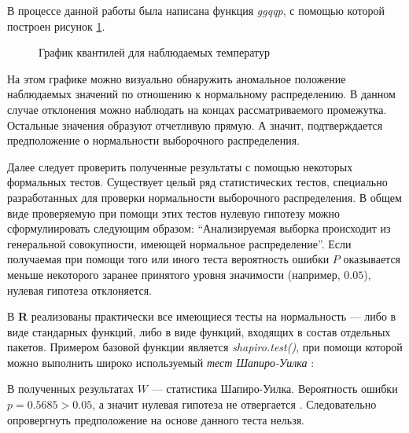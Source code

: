 В процессе данной работы была написана функция \textit{ggqqp}, с помощью которой построен рисунок \ref{img:qqnorm}.
\begin{figure}[ht]
\caption{График квантилей для наблюдаемых температур}
\label{img:qqnorm}
\end{figure}
На этом графике можно визуально обнаружить аномальное положение наблюдаемых значений по отношению к нормальному распределению. В данном случае отклонения можно наблюдать на концах рассматриваемого промежутка. Остальные значения образуют отчетливую прямую. А значит, подтверждается предположение о нормальности выборочного распределения.

Далее следует проверить полученные результаты с помощью некоторых формальных тестов. Существует целый ряд статистических тестов, специально разработанных для проверки нормальности выборочного распределения. В общем виде проверяемую при помощи этих тестов нулевую гипотезу можно сформулиировать следующим образом: ``Анализируемая выборка происходит из генеральной совокупности, имеющей нормальное распределение''. Если получаемая при помощи того или иного теста вероятность ошибки $P$ оказывается меньше некоторого заранее принятого уровня значимости (например, $0.05$), нулевая гипотеза отклоняется.

В \textbf{R} реализованы практически все имеющиеся тесты на нормальность --- либо в виде стандарных функций, либо в виде функций, входящих в состав отдельных пакетов. Примером базовой функции является \textit{shapiro.test()}, при помощи которой можно выполнить широко используемый \textit{тест Шапиро-Уилка} \cite{Shapiro1972}:

В полученных результатах $W$ --- статистика Шапиро-Уилка. Вероятность ошибки $p = 0.5685 > 0.05$, а значит нулевая гипотеза не отвергается \cite{Kobzar2006}. Следовательно опровергнуть предположение на основе данного теста нельзя.

